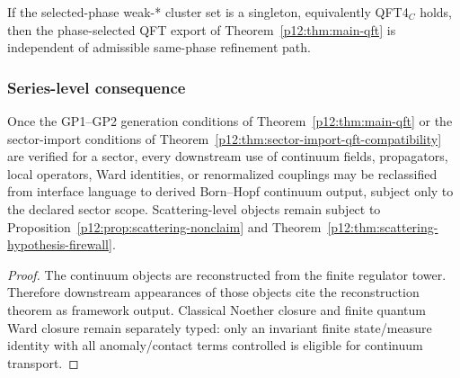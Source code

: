 \documentclass[12pt,a4paper]{article}
\begin{document}
\begin{corollary}
\label{p12:cor:v283-canonical-same-phase-export}
If the selected-phase weak-* cluster set is a singleton, equivalently QFT4$_C$ holds, then the phase-selected QFT export of Theorem~\ref{p12:thm:main-qft} is independent of admissible same-phase refinement path.
\end{corollary}


\subsubsection{Series-level consequence}
\label{p12:sec:series-level-qft-consequence}

\begin{corollary}
\label{p12:cor:benefit-for-series}
Once the GP1--GP2 generation conditions of Theorem~\ref{p12:thm:main-qft} or
the sector-import conditions of
Theorem~\ref{p12:thm:sector-import-qft-compatibility} are verified for a sector,
every downstream use of continuum fields, propagators, local operators, Ward
identities, or renormalized couplings may be reclassified from interface
language to derived Born--Hopf continuum output, subject only to the declared
sector scope.  Scattering-level objects remain subject to
Proposition~\ref{p12:prop:scattering-nonclaim} and
Theorem~\ref{p12:thm:scattering-hypothesis-firewall}.
\end{corollary}
\begin{proof}
The continuum objects are reconstructed from the finite regulator tower.  Therefore downstream appearances of those objects cite the reconstruction theorem as framework output.  Classical Noether closure and finite quantum Ward closure remain separately typed: only an invariant finite state/measure identity with all anomaly/contact terms controlled is eligible for continuum transport.
\end{proof}



\end{document}
